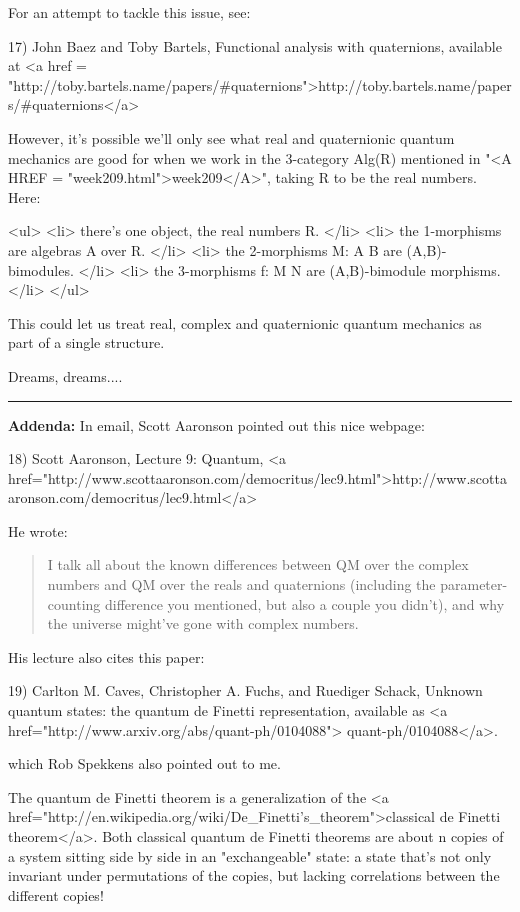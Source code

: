 For an attempt to tackle this issue, see:

17) John Baez and Toby Bartels, Functional analysis with quaternions,
available at <a href = "http://toby.bartels.name/papers/#quaternions">http://toby.bartels.name/papers/#quaternions</a>

However, it's possible we'll only see what real and quaternionic
quantum mechanics are good for when we work in the 3-category Alg(R)
mentioned in "<A HREF = "week209.html">week209</A>", taking
R to be the real numbers.  Here:

<ul>
<li>
there's one object, the real numbers R.
</li>
<li>
the 1-morphisms are algebras A over R.
</li>
<li>
the 2-morphisms M: A \to  B are (A,B)-bimodules.
</li>
<li>
the 3-morphisms f: M \to  N are (A,B)-bimodule morphisms.
</li>
</ul>

This could let us treat real, complex and quaternionic quantum
mechanics as part of a single structure.

Dreams, dreams....

\par\noindent\rule{\textwidth}{0.4pt}
\textbf{Addenda:} In email, Scott Aaronson pointed out this nice webpage:

18) Scott Aaronson, Lecture 9: Quantum, 
<a href="http://www.scottaaronson.com/democritus/lec9.html">http://www.scottaaronson.com/democritus/lec9.html</a>

He wrote:

\begin{quote}

I talk all about the known differences between QM over the complex
numbers and QM over the reals and quaternions (including the
parameter-counting difference you mentioned, but also a couple you
didn't), and why the universe might've gone with complex numbers.

\end{quote}
    

His lecture also cites this paper:

19) Carlton M. Caves, Christopher A. Fuchs, and Ruediger Schack, 
Unknown quantum states: the quantum de Finetti representation,
available as 
<a href="http://www.arxiv.org/abs/quant-ph/0104088">
quant-ph/0104088</a>.

which Rob Spekkens also pointed out to me.

The quantum de Finetti theorem is a generalization of the 
<a href="http://en.wikipedia.org/wiki/De_Finetti's_theorem">classical 
de Finetti theorem</a>.   Both classical quantum de Finetti theorems 
are about n copies of a system sitting side by side in an 
"exchangeable" state: a state that's not only invariant under 
permutations of the copies, but lacking correlations between the 
different copies!

